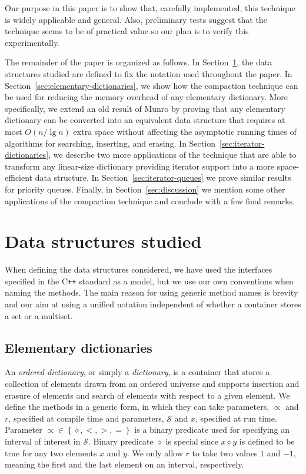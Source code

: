 \documentclass{DIKU-article}
\newcommand{\seclabel}[1]{\label{sec:#1}}
\newcommand{\secref}[1]{\mbox{Section~\ref{sec:#1}}}
\newcommand{\set}[1]{\left\{#1\right\}}
\begin{document}
Our purpose in this paper is to show that, carefully implemented, this
technique is widely applicable and general.  Also, preliminary tests
suggest that the technique seems to be of practical value so our plan
is to verify this experimentally.

The remainder of the paper is organized as follows.  In
\secref{sec:def}, the data structures studied are defined to fix the
notation used throughout the paper.  In
\secref{elementary-dictionaries}, we show how the compaction technique
can be used for reducing the memory overhead of any elementary
dictionary. More specifically, we extend an old result of Munro
\cite{Mun86} by proving that any elementary dictionary can be
converted into an equivalent data structure that requires at most
$O(n/\lg n)$ extra space without affecting the asymptotic running
times of algorithms for searching, inserting, and erasing.  In
\secref{iterator-dictionaries}, we describe two more applications of
the technique that are able to transform any linear-size
dictionary providing iterator support into a more space-efficient data
structure. In \secref{iterator-queues} we prove similar results for
priority queues.  Finally, in \secref{discussion} we mention some
other applications of the compaction technique and conclude with a few
final remarks.

\section{Data structures studied}%
\seclabel{sec:def}

When defining the data structures considered, we have used the
interfaces specified in the C\texttt{++} standard \cite[Clause
23]{ISO} as a model, but we use our own conventions when naming the
methods. The main reason for using generic method names is brevity and
our aim at using a unified notation independent of whether a container
stores a set or a multiset.

\subsection{Elementary dictionaries}

An \emph{ordered dictionary}, or simply a \emph{dictionary}, is a container that stores a
collection of elements drawn from an ordered universe and supports
insertion and erasure of elements and search of elements with respect
to a given element.  We define the methods in a generic form, in which
they can take parameters, $\propto$ and $\mathit{r}$, specified at
compile time and parameters, $\mathcal{S}$ and $x$, specified at run
time. Parameter $\propto \in \set{\diamond,<,>,=}$ is a binary
predicate used for specifying an interval of interest in
$\mathcal{S}$. Binary predicate $\diamond$ is special since $x
\diamond y$ is defined to be true for any two elements $x$ and $y$. We
only allow $r$ to take two values $1$ and $-1$, meaning the first and
the last element on an interval, respectively.
\end{document}
